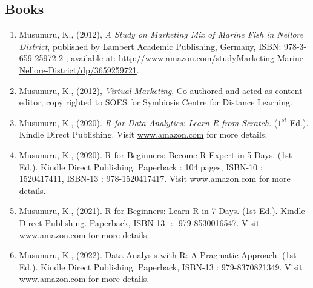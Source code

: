\documentclass[10pt]{article}
\begin{document}
\subsection{Books} 
\begin{enumerate} 

\item Musunuru, K., (2012), \emph{A Study on Marketing Mix of Marine Fish in Nellore District}, published by Lambert Academic  Publishing,  Germany,  ISBN:  978-3-659-25972-2  ;  available  at:  \url{http://www.amazon.com/studyMarketing-Marine-Nellore-District/dp/3659259721}. 

\item Musunuru, K., (2012), \emph{Virtual  Marketing}, Co-authored  and  acted as  content editor, copy  righted to  SOES for Symbiosis Centre for Distance Learning. 

\item Musunuru, K., (2020). \emph{R for Data Analytics: Learn R from Scratch}. ($1^{st}$ Ed.).  Kindle Direct Publishing. Visit \href{https://www.amazon.com/author/kamakshaiahmusunuru}{www.amazon.com} for more details. 


\item Musunuru, K., (2020). R for Beginners: Become R Expert in 5 Days. (1st Ed.). Kindle Direct Publishing. Paperback : 104 pages, ISBN-10 : 1520417411, ISBN-13 : 978-1520417417. Visit \href{https://www.amazon.in/Kamakshaiah-Musunuru/e/B08C7SVM7V}{www.amazon.com} for more details.

\item Musunuru, K., (2021). R for Beginners: Learn R in 7 Days. (1st Ed.). Kindle Direct Publishing. Paperback, ISBN-13 ‏ : ‎ 979-8530016547. Visit \href{https://www.amazon.in/Beginners-Learn-Days/dp/B098RS71Q4/}{www.amazon.com} for more details.

\item Musunuru, K., (2022). Data Analysis with R: A Pragmatic Approach. (1st Ed.). Kindle Direct Publishing. Paperback, ISBN-13 ‏: ‎979-8370821349. Visit \href{https://www.amazon.com/Data-Analysis-R-Pragmatic-Approach/dp/B0BQG6VYNH}{www.amazon.com} for more details.

\end{enumerate} 
\end{document}
